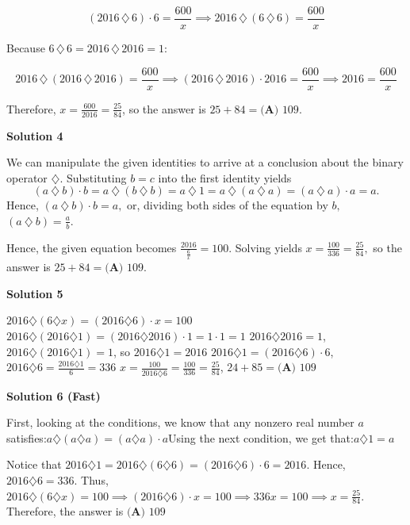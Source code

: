 \begin{enumerate}
 
 \[(2016\, \diamondsuit\, 6) \cdot 6 = \frac{600}{x}\implies  2016 \, \diamondsuit\, (6\, \diamondsuit\, 6) = \frac{600}{x}\]

 Because $6\, \diamondsuit\, 6 = 2016\, \diamondsuit\, 2016 = 1:$

 \[2016 \, \diamondsuit\, (2016\, \diamondsuit\, 2016) = \frac{600}{x}\implies  (2016\, \diamondsuit\, 2016) \cdot 2016 = \frac{600}{x}\implies  2016 = \frac{600}{x}\]

 Therefore, $x = \frac{600}{2016} = \frac{25}{84}$, so the answer is $25 + 84 = \boxed{\textbf{(A) }109.}$




\textbf{Solution 4}

We can manipulate the given identities to arrive at a conclusion about the binary operator $\diamondsuit$.  Substituting $b = c$ into the first identity yields 
 \[( a\ \diamondsuit\ b) \cdot b = a\ \diamondsuit\ (b\ \diamondsuit\  b) = a\ \diamondsuit\  1 = a\ \diamondsuit\ ( a\ \diamondsuit\ a) = ( a\ \diamondsuit\ a) \cdot a = a.\]  Hence, $( a\ \diamondsuit\ b) \cdot b = a,$ or, dividing both sides of the equation by $b,$ $( a\ \diamondsuit\ b) = \frac{a}{b}.$

 Hence, the given equation becomes $\frac{2016}{\frac{6}{x}} = 100$.  Solving yields $x=\frac{100}{336} = \frac{25}{84},$ so the answer is $25 + 84 = \boxed{\textbf{(A) }109.}$




\textbf{Solution 5}

$2016 \diamondsuit (6 \diamondsuit x) = (2016 \diamondsuit 6) \cdot x = 100$
$2016 \diamondsuit (2016 \diamondsuit 1) = (2016 \diamondsuit 2016) \cdot 1 = 1 \cdot 1 = 1$
$2016 \diamondsuit 2016 = 1$, $2016 \diamondsuit (2016 \diamondsuit 1) = 1$, so $2016 \diamondsuit 1 = 2016$
$2016  \diamondsuit 1 = (2016  \diamondsuit 6) \cdot 6$, $2016 \diamondsuit 6 = \frac{2016  \diamondsuit 1}{6} = 336$
$x = \frac{100}{2016 \diamondsuit 6} = \frac{100}{336} = \frac{25}{84}$, $24 + 85 = \boxed{\textbf{(A) }109}$




\textbf{Solution 6 (Fast)}

First, looking at the conditions, we know that any nonzero real number $a$ satisfies:$a \diamondsuit (a \diamondsuit a) = (a \diamondsuit a) \cdot a$Using the next condition, we get that:$a \diamondsuit 1 = a$

 Notice that $2016 \diamondsuit 1 = 2016 \diamondsuit (6 \diamondsuit 6) = (2016 \diamondsuit 6) \cdot 6 =  2016$. Hence, $2016 \diamondsuit 6 = 336$. Thus, $2016 \diamondsuit (6 \diamondsuit x)=100 \implies (2016 \diamondsuit 6) \cdot x = 100 \implies 336x=100 \implies x=\frac{25}{84}$. Therefore, the answer is $\boxed{\textbf{(A) }109}$





\end{enumerate}
